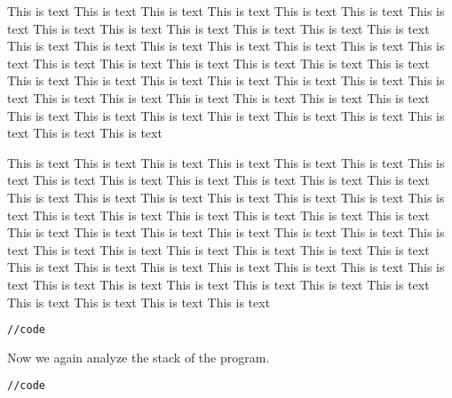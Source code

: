 \documentclass[a4paper]{uestcreport}
\begin{document}
This is text This is text This is text This is text This is text This is text This is text This is text This is text This is text This is text This is text This is text This is text This is text This is text This is text This is text This is text This is text This is text This is text This is text This is text This is text This is text This is text This is text This is text This is text This is text This is text This is text This is text This is text This is text This is text This is text This is text This is text This is text This is text This is text This is text This is text This is text This is text This is text 

This is text This is text This is text This is text This is text This is text This is text This is text This is text This is text This is text This is text This is text This is text This is text This is text This is text This is text This is text This is text This is text This is text This is text This is text This is text This is text This is text This is text This is text This is text This is text This is text This is text This is text This is text This is text This is text This is text This is text This is text This is text This is text This is text This is text This is text This is text This is text This is text This is text This is text This is text This is text This is text This is text This is text This is text 

\begin{lstlisting}[language=sh]
//code
\end{lstlisting}

Now we again analyze the stack of the program.
\begin{lstlisting}[language=sh]
//code
\end{lstlisting}
\end{document}
